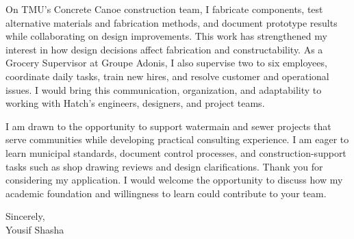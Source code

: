 \documentclass[11pt]{article}
\begin{document}
On TMU's Concrete Canoe construction team, I fabricate components, test alternative materials and fabrication methods, and document prototype results while collaborating on design improvements. This work has strengthened my interest in how design decisions affect fabrication and constructability. As a Grocery Supervisor at Groupe Adonis, I also supervise two to six employees, coordinate daily tasks, train new hires, and resolve customer and operational issues. I would bring this communication, organization, and adaptability to working with Hatch's engineers, designers, and project teams.

I am drawn to the opportunity to support watermain and sewer projects that serve communities while developing practical consulting experience. I am eager to learn municipal standards, document control processes, and construction-support tasks such as shop drawing reviews and design clarifications. Thank you for considering my application. I would welcome the opportunity to discuss how my academic foundation and willingness to learn could contribute to your team.

Sincerely,\\[4pt]
Yousif Shasha
\end{document}
